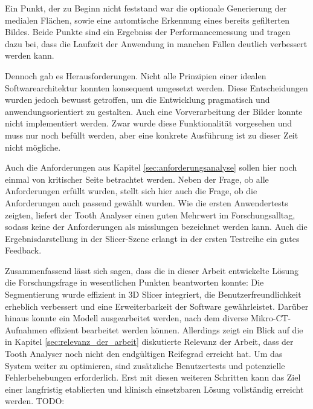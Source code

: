 Ein Punkt, der zu Beginn nicht feststand war die optionale Generierung der medialen
Flächen, sowie eine automtische Erkennung eines bereits gefilterten Bildes. Beide
Punkte sind ein Ergebniss der Performancemessung und tragen dazu bei, dass die
Laufzeit der Anwendung in manchen Fällen deutlich verbessert werden kann.

Dennoch gab es Herausforderungen. Nicht alle Prinzipien einer idealen Softwarearchitektur
konnten konsequent umgesetzt werden. Diese Entscheidungen wurden jedoch bewusst
getroffen, um die Entwicklung pragmatisch und anwendungsorientiert zu gestalten.
Auch eine Vorverarbeitung der Bilder konnte nicht implementiert werden. Zwar wurde
diese Funktionalität vorgesehen und muss nur noch befüllt werden, aber eine
konkrete Ausführung ist zu dieser Zeit nicht mögliche.

Auch die Anforderungen aus Kapitel \ref{sec:anforderungsanalyse} sollen hier
noch einmal von kritischer Seite betrachtet werden. Neben der Frage, ob alle
Anforderungen erfüllt wurden, stellt sich hier auch die Frage, ob die
Anforderungen auch passend gewählt wurden. Wie die ersten Anwendertests zeigten,
liefert der Tooth Analyser einen guten Mehrwert im Forschungsalltag, sodass keine
der Anforderungen als misslungen bezeichnet werden kann. Auch die
Ergebnisdarstellung in der Slicer-Szene erlangt in der ersten Testreihe ein
gutes Feedback.

Zusammenfassend lässt sich sagen, dass die in dieser Arbeit entwickelte Lösung die
Forschungsfrage in wesentlichen Punkten beantworten konnte: Die Segmentierung
wurde effizient in 3D Slicer integriert, die Benutzerfreundlichkeit erheblich verbessert
und eine Erweiterbarkeit der Software gewährleistet. Darüber hinaus konnte ein
Modell ausgearbeitet werden, nach dem diverse Mikro-CT-Aufnahmen effizient bearbeitet
werden können. Allerdings zeigt ein Blick auf die in Kapitel
\ref{sec:relevanz_der_arbeit} diskutierte Relevanz der Arbeit, dass der Tooth Analyser
noch nicht den endgültigen Reifegrad erreicht hat. Um das System weiter zu
optimieren, sind zusätzliche Benutzertests und potenzielle Fehlerbehebungen erforderlich.
Erst mit diesen weiteren Schritten kann das Ziel einer langfristig etablierten
und klinisch einsetzbaren Lösung vollständig erreicht werden.
TODO:

